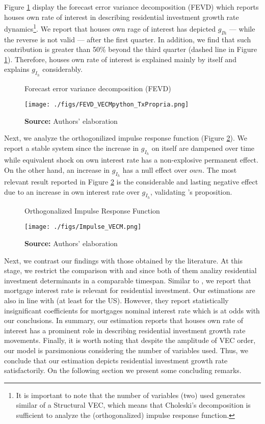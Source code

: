 \documentclass[12pt, a4paper]{article}
\begin{document}
Figure \ref{fevd} display the forecast error variance decomposition (FEVD) which reports houses own rate of interest in describing residential investment growth rate dynamics\footnote{It is important to note that the number of variables (two) used generates similar  of a Structural VEC, which means that Choleski's decomposition is sufficient to analyze the (orthogonalized) impulse response function.}.
We report that houses own rage of interest has  depicted  \(g_{Ih}\) --- while the reverse is not valid --- after the first quarter.
In addition, we find that such contribution is greater than 50\% beyond the third quarter (dashed line in Figure \ref{fevd}).
Therefore, houses own rate of interest is explained mainly by itself and explains \(g_{I_h}\) considerably.

\begin{figure}[H]
	\centering
	\caption{Forecast error variance decomposition (FEVD)}
	\label{fevd}
	\texttt{[image: ./figs/FEVD\_VECMpython\_TxPropria.png]}
	\caption*{\textbf{Source:} Authors' elaboration}
\end{figure}

Next, we analyze the orthogonilized impulse response function (Figure \ref{irf}).
We report a stable system since the increase in \(g_{I_h}\) on itself are dampened over time while equivalent shock on own interest rate has a non-explosive permanent effect.
On the other hand, an increase in \(g_{I_h}\) has a null effect over \(own\).
The most relevant result reported in Figure \ref{irf} is the considerable and lasting negative effect due to an increase in own interest rate over \(g_{I_h}\), validating \citeauthor*{teixeira_crescimento_2015}'s \citeyear{teixeira_crescimento_2015} proposition.

\begin{figure}[H]
	\centering
	\caption{Orthogonalized Impulse Response Function}
	\label{irf}
	\texttt{[image: ./figs/Impulse\_VECM.png]}
	\caption*{\textbf{Source:} Authors' elaboration}
\end{figure}


Next,  we contrast our findings with those obtained by the literature.
At this stage, we restrict the comparison with  \textcite{gauger_residential_2003} and \textcite{arestis_residential_2015} since both of them analizy residential investment determinants in a comparable timespan.
Similar to \textcite{gauger_residential_2003}, we report that mortgage interest rate is relevant for residential investment.
Our estimations are also in line with \textcite{arestis_residential_2015} (at least for the US).
However, they report statistically insignificant coefficients for mortgages nominal interest rate which is at odds with our conclusions.
In summary, our estimation reports that houses own rate of interest has a prominent role in describing residential investment growth rate movements.
Finally, it is worth noting that despite the amplitude of VEC order, our model is parsimonious considering the number of variables used.
Thus, we conclude that our estimation depicts residential investment growth rate satisfactorily.
On the following section we present some concluding remarks.
\end{document}
